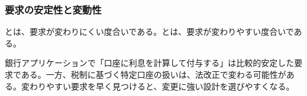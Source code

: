 \subsubsection{要求の安定性と変動性}

とは、要求が変わりにくい度合いである。とは、要求が変わりやすい度合いである。

銀行アプリケーションで「口座に利息を計算して付与する」は比較的安定した要求である。一方、税制に基づく特定口座の扱いは、法改正で変わる可能性がある。変わりやすい要求を早く見つけると、変更に強い設計を選びやすくなる。
